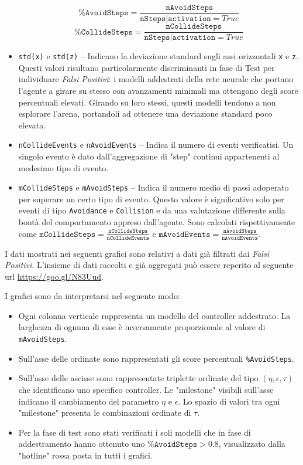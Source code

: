 \begin{itemize}
    $$\texttt{\%AvoidSteps} = \frac{\texttt{nAvoidSteps}}{\texttt{nSteps} | \texttt{activation}=True}$$
    $$\texttt{\%CollideSteps} = \frac{\texttt{nCollideSteps}}{\texttt{nSteps} | \texttt{activation}=True}$$
   
    \item \texttt{std(x)} e \texttt{std(z)} -- Indicano la deviazione standard sugli assi orizzontali \texttt{x} e \texttt{z}. Questi valori risultano particolarmente discriminanti in fase di Test per individuare \textit{Falsi Positivi}: i modelli addestrati della rete neurale che portano l'agente a girare su stesso con avanzamenti minimali ma ottengono degli score percentuali elevati. Girando su loro stessi, questi modelli tendono a non esplorare l'arena, portandoli ad ottenere una deviazione standard poco elevata.
    
    \item \texttt{nCollideEvents} e \texttt{nAvoidEvents} -- Indica il numero di eventi verificatisi. Un singolo evento è dato dall'aggregazione di "step" continui appartenenti al medesimo tipo di evento.
    
    \item \texttt{mCollideSteps} e \texttt{mAvoidSteps} -- Indica il numero medio di passi adoperato per superare un certo tipo di evento. Questo valore è significativo solo per eventi di tipo \texttt{Avoidance} e \texttt{Collision} e da una valutazione differente sulla bontà del comportamento appreso dall'agente. Sono calcolati rispettivamente come $\texttt{mCollideSteps} = \frac{\texttt{nCollideSteps}}{\texttt{nCollideEvents}}$ e $\texttt{mAvoidEvents} = \frac{\texttt{nAvoidSteps}}{\texttt{nAvoidEvents}}$.
    
\end{itemize}

I dati mostrati nei seguenti grafici sono relativi a dati già filtrati dai \textit{Falsi Positivi}. L'insieme di dati raccolti e già aggregati può essere reperito al seguente url \url{https://goo.gl/N83Uud}. 

I grafici sono da interpretarsi nel seguente modo:
\begin{itemize}
    \item Ogni colonna verticale rappresenta un modello del controller addestrato. La larghezza di ognuna di esse è inversamente proporzionale al valore di \texttt{mAvoidSteps}.
    \item Sull'asse delle ordinate sono rappresentati gli score percentuali \texttt{\%AvoidSteps}.
    \item Sull'asse delle ascisse sono rappresentate triplette ordinate del tipo $(\eta, \epsilon, \tau)$ che identificano uno specifico controller. Le "milestone" visibili sull'asse indicano il cambiamento del parametro $\eta$ e $\epsilon$. Lo spazio di valori tra ogni "milestone" presenta le combinazioni ordinate di $\tau$.
    \item Per la fase di test sono stati verificati i soli modelli che in fase di addestramento hanno ottenuto uno $\texttt{\%AvoidSteps} > 0.8$, visualizzato dalla "hotline" rossa posta in tutti i grafici. 
\end{itemize}

